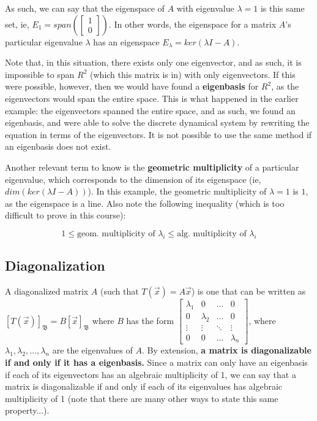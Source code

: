 \documentclass[12pt]{article}
\begin{document}
{{As such, we can say that the eigenspace of $A$ with eigenvalue $\lambda = 1$ is this same set, ie, $E_1=span(\begin{bmatrix}
    1\\
    0\end{bmatrix})$. In other words, the eigenspace for a matrix $A$'s particular eigenvalue $\lambda$ has an eigenspace $E_\lambda = ker(\lambda I - A)$.

Note that, in this situation, there exists only one eigenvector, and as such, it is impossible to span $R^2$ (which this matrix is in) with only eigenvectors. If this were possible, however, then we would have found a \textbf{eigenbasis} for $R^2$, as the eigenvectors would span the entire space. This is what happened in the earlier example: the eigenvectors spanned the entire space, and as such, we found an eigenbasis, and were able to solve the discrete dynamical system by rewriting the equation in terms of the eigenvectors. It is not possible to use the same method if an eigenbasis does not exist.

Another relevant term to know is the \textbf{geometric multiplicity} of a particular eigenvalue, which corresponds to the dimension of its eigenspace (ie, $dim(ker(\lambda I - A))$). In this example, the geometric multiplicity of $\lambda = 1$ is $1$, as the eigenspace is a line. Also note the following inequality (which is too difficult to prove in this course):

\begin{equation}
    1 \leq \text{geom. multiplicity of } \lambda_i \leq \text{alg. multiplicity of } \lambda_i
\end{equation}


\subsection{Diagonalization}

A diagonalized matrix $A$ (such that $T(\vec{x}) = A\vec{x}$) is one that can be written as $[T(\vec{x})]_{\mathfrak{B}} = B[\vec{x}]_{\mathfrak{B}}$ where $B$ has the form $\begin{bmatrix}
    \lambda_1 & 0 & \dots & 0\\
    0 & \lambda_2 & \dots & 0\\
    \vdots & \vdots & \ddots & \vdots\\
    0 & 0 & \dots & \lambda_n
\end{bmatrix}$, where $\lambda_1, \lambda_2, \dots, \lambda_n$ are the eigenvalues of $A$. By extension, \textbf{a matrix is diagonalizable if and only if it has a eigenbasis.} Since a matrix can only have an eigenbasis if each of its eigenvectors has an algebraic multiplicity of 1, we can say that a matrix is diagonalizable if and only if each of its eigenvalues has algebraic multiplicity of 1 (note that there are many other ways to state this same property...).

}}
\end{document}
